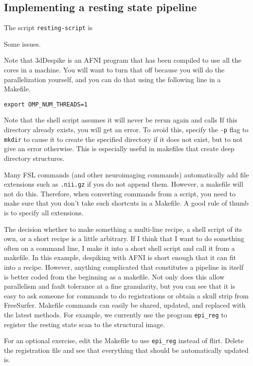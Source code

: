 \subsection{Implementing a resting state pipeline}

The script \texttt{resting-script} is 

Some issues.

Note that 3dDespike is an AFNI program that has been compiled to use all the cores in a machine. You will want to turn that off because you will do the parallelization yourself, and you can do that using the following line in a Makefile.

\texttt{export OMP_NUM_THREADS=1}

Note that the shell script assumes it will never be rerun again and
calls  If this directory already exists, you
will get an error. To avoid this, specify the \texttt{-p} flag to
\texttt{mkdir} to cause it to create the specified directory if it
does not exist, but to not give an error otherwise. This is especially
useful in makefiles that create deep directory structures.

Many FSL commands (and other neuroimaging commands) automatically add
file extensions such as \texttt{.nii.gz} if you do not append
them. However, a makefile will not do this. Therefore, when converting
commands from a script, you need to make sure that you don't take such
shortcuts in a Makefile. A good rule of thumb is to specify all extensions.

The decision whether to make something a multi-line recipe, a shell
script of its own, or a short recipe is a little arbitrary. If I think
that I want to do something often on a command line, I make it into a
short shell script and call it from a makefile. In this example,
despiking with AFNI is short enough that it can fit into a
recipe. However, anything complicated that constitutes a pipeline in
itself is better coded from the beginning as a makefile. Not only does
this allow parallelism and fault tolerance at a fine granularity, but
you can see that it is easy to ask someone for commands to do
registrations or obtain a skull strip from FreeSurfer. Makefile
commands can easily be shared, updated, and replaced with the latest
methods. For example, we currently use the program \texttt{epi_reg} to
register the resting state scan to the structural image. 

For an optional exercise, edit the Makefile to use \texttt{epi_reg}
instead of flirt. Delete the registration file and see that everything
that should be automatically updated is.

\subsection{}


